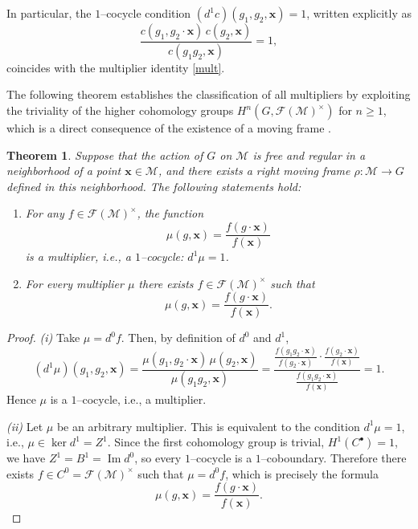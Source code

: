 \documentclass[12pt,reqno]{amsart}
\newtheorem{theorem}{Theorem}
\begin{document}
In particular, the $1$--cocycle condition $(d^1 c)(g_1,g_2,\boldsymbol x)=1$,
written explicitly as
$$
\frac{c(g_1,g_2\!\cdot\!\boldsymbol x)\,c(g_2,\boldsymbol x)}
{c(g_1 g_2,\boldsymbol x)}=1,
$$
coincides with the multiplier identity \eqref{mult}.

\medskip


The following theorem establishes the classification of all multipliers by exploiting the triviality of the higher cohomology groups $H^n(G, \mathcal{F}(\mathcal{M})^\times)$ for $n \geq 1$, which is a direct consequence of the existence of a moving frame \cite[Section~5]{B-2025}.


\begin{theorem} Suppose that the action of $G$ on $\mathcal{M}$ is free and regular in a neighborhood of a point $\boldsymbol{x} \in \mathcal{M}$, and there exists a right moving frame $\rho: \mathcal{M} \to G$ defined in this neighborhood.
The following statements hold:
\begin{enumerate}
\item[(i)]
For any $f\in\mathcal F(\mathcal M)^\times$, the function
$$
\mu(g,\boldsymbol x)
=
\frac{f(g\!\cdot\!\boldsymbol x)}{f(\boldsymbol x)}
$$
is a multiplier, i.e., a $1$--cocycle: $d^1\mu = 1$.

\item[(ii)]
For every multiplier $\mu$ there exists $f\in\mathcal F(\mathcal M)^\times$ such that
$$
\mu(g,\boldsymbol x)
=
\frac{f(g\!\cdot\!\boldsymbol x)}{f(\boldsymbol x)}.
$$
\end{enumerate}
\end{theorem}

\begin{proof}
\textit{(i)}
Take $\mu=d^0 f$. Then, by definition of $d^0$ and $d^1$,
$$
(d^1\mu)(g_1,g_2,\boldsymbol x)
=
\frac{\mu(g_1,g_2\!\cdot\!\boldsymbol x)\,\mu(g_2,\boldsymbol x)}
{\mu(g_1 g_2,\boldsymbol x)}
=
\frac{
\displaystyle
\frac{f(g_1 g_2\!\cdot\!\boldsymbol x)}{f(g_2\!\cdot\!\boldsymbol x)}
\cdot
\frac{f(g_2\!\cdot\!\boldsymbol x)}{f(\boldsymbol x)}
}{
\displaystyle
\frac{f(g_1 g_2\!\cdot\!\boldsymbol x)}{f(\boldsymbol x)}
}
=1.
$$
Hence $\mu$ is a $1$--cocycle, i.e., a multiplier.

\smallskip
\textit{(ii)}
Let $\mu$ be an arbitrary multiplier. This is equivalent to the condition
$d^1\mu = 1$, i.e., $\mu\in \ker d^1 = Z^1$.
Since the first cohomology group is trivial, $H^1(C^\bullet)=1$,
we have $Z^1 = B^1 = \operatorname{Im} d^0$,
so every $1$--cocycle is a $1$--coboundary.
Therefore there exists $f\in C^0=\mathcal F(\mathcal M)^\times$ such that $\mu=d^0 f$,
which is precisely the formula
$$
\mu(g,\boldsymbol x)
=
\frac{f(g\!\cdot\!\boldsymbol x)}{f(\boldsymbol x)}.
$$
\end{proof}
\end{document}
